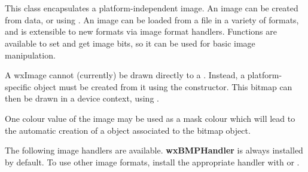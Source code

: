 \section{}\label{wximage}

This class encapsulates a platform-independent image. An image can be created
from data, or using . An image
can be loaded from a file in a variety of formats, and is extensible to new formats
via image format handlers. Functions are available to set and get image bits, so
it can be used for basic image manipulation.

A wxImage cannot (currently) be drawn directly to a . Instead, 
a platform-specific  object must be created from it using
the  constructor. 
This bitmap can then
be drawn in a device context, using .

One colour value of the image may be used as a mask colour which will lead to the automatic
creation of a  object associated to the bitmap object.


The following image handlers are available. {\bf wxBMPHandler} is always
installed by default. To use other image formats, install the appropriate
handler with  or 
.

\twocolwidtha{5cm}%
\begin{twocollist}
\end{twocollist}

